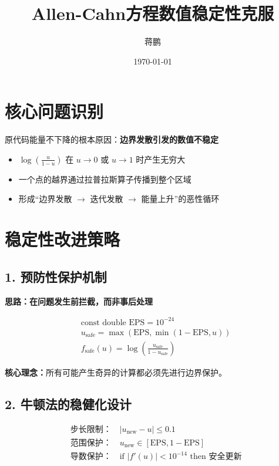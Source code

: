 \documentclass[11pt,a4 paper,one side]{article}
\title{Allen-Cahn方程数值稳定性克服}
\date{\today}
\author{蒋鹏}
\begin{document}
\maketitle
\tableofcontents

\section*{核心问题识别}
原代码能量不下降的根本原因：\textbf{边界发散引发的数值不稳定}

\begin{itemize}
    \item $\log\left(\frac{u}{1-u}\right)$ 在 $u \to 0$ 或 $u \to 1$ 时产生无穷大
    \item 一个点的越界通过拉普拉斯算子传播到整个区域  
    \item 形成“边界发散 $\to$ 迭代发散 $\to$ 能量上升”的恶性循环
\end{itemize}

\section*{稳定性改进策略}

\subsection*{1. 预防性保护机制}

\textbf{思路：在问题发生前拦截，而非事后处理}

\begin{align*}
&\text{const double EPS} = 10^{-24}\\
&u_{\text{safe}} = \max(\text{EPS}, \min(1-\text{EPS}, u))\\
&f_{\text{safe}}(u) = \log\left(\frac{u_{\text{safe}}}{1-u_{\text{safe}}}\right)
\end{align*}

\textbf{核心理念：}所有可能产生奇异的计算都必须先进行边界保护。

\subsection*{2. 牛顿法的稳健化设计}

\begin{align*}
&\text{步长限制：} \quad |u_{\text{new}} - u| \leq 0.1\\
&\text{范围保护：} \quad u_{\text{new}} \in [\text{EPS}, 1-\text{EPS}]\\
&\text{导数保护：} \quad \text{if } |f'(u)| < 10^{-14} \text{ then 安全更新}
\end{align*}
\end{document}
